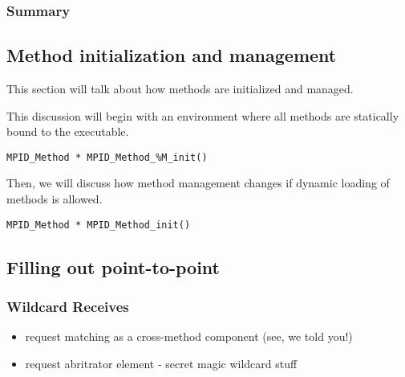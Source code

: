 

\subsubsection{Summary}



\subsection{Method initialization and management}

This section will talk about how methods are initialized and managed.

This discussion will begin with an environment where all methods are
statically bound to the executable.

\begin{verbatim}
MPID_Method * MPID_Method_%M_init()
\end{verbatim}

Then, we will discuss how method management changes if dynamic
loading of methods is allowed.

\begin{verbatim}
MPID_Method * MPID_Method_init()
\end{verbatim}


\subsection{Filling out point-to-point}

\subsubsection{Wildcard Receives}
\begin{itemize}
  \item request matching as a cross-method component (see, we told you!)
  \item request abritrator element - secret magic wildcard stuff
\end{itemize}

